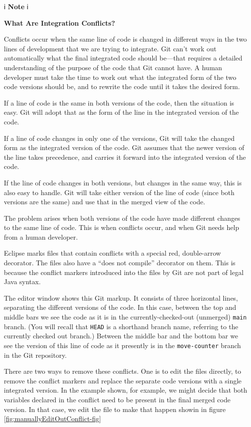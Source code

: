 \documentclass[
]{book}
\begin{document}
ℹ️ \textbf{Note} ℹ️

\textbf{What Are Integration Conflicts?}

Conflicts occur when the same line of code is changed in different ways in the two lines of development that we are trying to integrate. Git can't work out automatically what the final integrated code should be---that requires a detailed understanding of the purpose of the code that Git cannot have. A human developer must take the time to work out what the integrated form of the two code versions should be, and to rewrite the code until it takes the desired form.

If a line of code is the same in both versions of the code, then the situation is easy. Git will adopt that as the form of the line in the integrated version of the code.

If a line of code changes in only one of the versions, Git will take the changed form as the integrated version of the code. Git assumes that the newer version of the line takes precedence, and carries it forward into the integrated version of the code.

If the line of code changes in both versions, but changes in the same way, this is also easy to handle. Git will take either version of the line of code (since both versions are the same) and use that in the merged view of the code.

The problem arises when both versions of the code have made different changes to the same line of code. This is when conflicts occur, and when Git needs help from a human developer.

Eclipse marks files that contain conflicts with a special red, double-arrow decorator. The files also have a ``does not compile'' decorator on them. This is because the conflict markers introduced into the files by Git are not part of legal Java syntax.

The editor window shows this Git markup. It consists of three horizontal lines, separating the different versions of the code. In this case, between the top and middle bars we see the code as it is in the currently-checked-out (unmerged) \texttt{main} branch. (You will recall that \texttt{HEAD} is a shorthand branch name, referring to the currently checked out branch.) Between the middle bar and the bottom bar we see the version of this line of code as it presently is in the \texttt{move-counter} branch in the Git repository.

There are two ways to remove these conflicts. One is to edit the files directly, to remove the conflict markers and replace the separate code versions with a single integrated version. In the example shown, for example, we might decide that both variables declared in the conflict need to be present in the final merged code version. In that case, we edit the file to make that happen showin in figure \ref{fig:manuallyEditOutConflict-fig}
\end{document}
